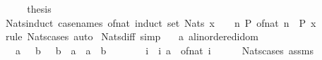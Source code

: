 \begin{isabellebody}
\isanewline
\ \ \isamarkupfalse%
\ \isamarkupfalse%
\ thesis\ \isacommand{{\isachardot}{\kern0pt}{\isachardot}{\kern0pt}}\isamarkupfalse%
\isanewline
{}\isamarkupfalse%
%
\endisatagproof
{\isafoldproof}%
%
\isadelimproof
\isanewline
%
\endisadelimproof
\isanewline
{}\isamarkupfalse%
\ Nats{\isacharunderscore}{\kern0pt}induct\ {\isacharbrackleft}{\kern0pt}case{\isacharunderscore}{\kern0pt}names\ of{\isacharunderscore}{\kern0pt}nat{\isacharcomma}{\kern0pt}\ induct\ set{\isacharcolon}{\kern0pt}\ Nats{\isacharbrackright}{\kern0pt}{\isacharcolon}{\kern0pt}\ {\isachardoublequoteopen}x\ {\isasymin}\ {\isasymnat}\ {\isasymLongrightarrow}\ {\isacharparenleft}{\kern0pt}{\isasymAnd}n{\isachardot}{\kern0pt}\ P\ {\isacharparenleft}{\kern0pt}of{\isacharunderscore}{\kern0pt}nat\ n{\isacharparenright}{\kern0pt}{\isacharparenright}{\kern0pt}\ {\isasymLongrightarrow}\ P\ x{\isachardoublequoteclose}\isanewline
%
\isadelimproof
\ \ %
\endisadelimproof
%
\isatagproof
{}\isamarkupfalse%
\ {\isacharparenleft}{\kern0pt}rule\ Nats{\isacharunderscore}{\kern0pt}cases{\isacharparenright}{\kern0pt}\ auto%
\endisatagproof
{\isafoldproof}%
%
\isadelimproof
\isanewline
%
\endisadelimproof
\isanewline
{}\isamarkupfalse%
\isanewline
\isanewline
{}\isamarkupfalse%
\ Nats{\isacharunderscore}{\kern0pt}diff\ {\isacharbrackleft}{\kern0pt}simp{\isacharbrackright}{\kern0pt}{\isacharcolon}{\kern0pt}\isanewline
\ \ \ a{\isacharcolon}{\kern0pt}{\isacharcolon}{\kern0pt}\ {\isachardoublequoteopen}{\isacharprime}{\kern0pt}a{\isacharcolon}{\kern0pt}{\isacharcolon}{\kern0pt}linordered{\isacharunderscore}{\kern0pt}idom{\isachardoublequoteclose}\isanewline
\ \ \ {\isachardoublequoteopen}a\ {\isasymin}\ {\isasymnat}{\isachardoublequoteclose}\ {\isachardoublequoteopen}b\ {\isasymin}\ {\isasymnat}{\isachardoublequoteclose}\ {\isachardoublequoteopen}b\ {\isasymle}\ a{\isachardoublequoteclose}\ \ {\isachardoublequoteopen}a\ {\isacharminus}{\kern0pt}\ b\ {\isasymin}\ {\isasymnat}{\isachardoublequoteclose}\isanewline
%
\isadelimproof
%
\endisadelimproof
%
\isatagproof
{}\isamarkupfalse%
\ {\isacharminus}{\kern0pt}\isanewline
\ \ \isamarkupfalse%
\ i\ \ i{\isacharcolon}{\kern0pt}\ {\isachardoublequoteopen}a\ {\isacharequal}{\kern0pt}\ of{\isacharunderscore}{\kern0pt}nat\ i{\isachardoublequoteclose}\isanewline
\ \ \ \ \isamarkupfalse%
\ Nats{\isacharunderscore}{\kern0pt}cases\ assms\ \isamarkupfalse%

\end{isabellebody}
